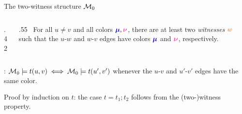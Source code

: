 \begin{frame}{The two-witness structure $\mathcal M_0$}

\begin{columns}[c]
  \begin{column}{.42\textwidth}
    \centering
    

  \end{column}
  \begin{column}{.55\textwidth}
     \ For all $u \ne v$ and all colors $\textcolor{cA}{\boldsymbol{\mu}}, \textcolor{cD}{\boldsymbol{\nu}}$,
    there are at least two \emph{witnesses} $\textcolor{cW}{w}$ such that
    the $u$-$w$ and $w$-$v$ edges have colors $\textcolor{cA}{\boldsymbol{\mu}}$ and $\textcolor{cD}{\boldsymbol{\nu}}$, respectively.
  \end{column}
\end{columns}

\vfill
\pause
\vspace{.3em}
: $\mathcal M_0 \models t(u, v) \iff \mathcal M_0 \models t(u', v')$
whenever the $u$-$v$ and $u'$-$v'$ edges have the same color.

\vspace{1em}
Proof by induction on $t$: the case $t = t_1 \mathbin{;} t_2$ follows from the (two-)witness property.

\vspace{.6em}

\end{frame}

